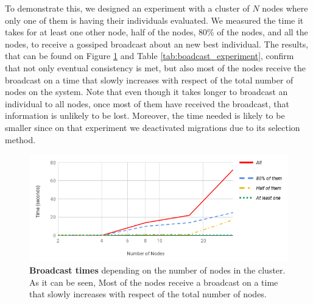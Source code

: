 To demonstrate this, we designed an experiment with a cluster of $N$ nodes where only one of them is having their individuals evaluated. We measured the time it takes for at least one other node, half of the nodes, 80\% of the nodes, and all the nodes, to receive a gossiped broadcast about an new best individual. The results, that can be found on Figure \ref{fig:broadcast_experiment} and Table \ref{tab:boadcast_experiment}, confirm that not only eventual consistency is met, but also most of the nodes receive the broadcast on a time that slowly increases with respect of the total number of nodes on the system. Note that even though it takes longer to broadcast an individual to all nodes, once most of them have received the broadcast, that information is unlikely to be lost.  Moreover, the time needed is likely to be smaller since on that experiment we deactivated migrations due to its selection method.

\begin{figure}[h!]
		\centering
    	\includegraphics[width=\linewidth]{assets/images/broadcast-experiment.png}
    	\caption{\textbf{Broadcast times} depending on the number of nodes in the cluster. As it can be seen, Most of the nodes receive a broadcast on a time that slowly increases with respect of the total number of nodes.}
    	\label{fig:broadcast_experiment}
\end{figure}

